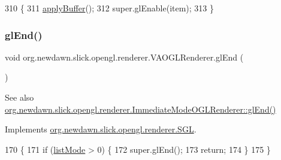 \begin{DoxyCode}
310                                    \{
311         \mbox{\hyperlink{classorg_1_1newdawn_1_1slick_1_1opengl_1_1renderer_1_1_v_a_o_g_l_renderer_a7c5d09419cd40761be8f849631aebab5}{applyBuffer}}();
312         super.glEnable(item);
313     \}
\end{DoxyCode}
\mbox{\label{classorg_1_1newdawn_1_1slick_1_1opengl_1_1renderer_1_1_v_a_o_g_l_renderer_aa652d16e703985c4415f750d7e4483d5}} 
\subsubsection{\texorpdfstring{gl\+End()}{glEnd()}}
{\footnotesize\ttfamily void org.\+newdawn.\+slick.\+opengl.\+renderer.\+V\+A\+O\+G\+L\+Renderer.\+gl\+End (\begin{DoxyParamCaption}{ }\end{DoxyParamCaption})\hspace{0.3cm}{\ttfamily [inline]}}

\begin{DoxySeeAlso}{See also}
\mbox{\hyperlink{classorg_1_1newdawn_1_1slick_1_1opengl_1_1renderer_1_1_immediate_mode_o_g_l_renderer_aed3061aaf4d048fe00f25d191974b0f3}{org.\+newdawn.\+slick.\+opengl.\+renderer.\+Immediate\+Mode\+O\+G\+L\+Renderer\+::gl\+End()}} 
\end{DoxySeeAlso}


Implements \mbox{\hyperlink{interfaceorg_1_1newdawn_1_1slick_1_1opengl_1_1renderer_1_1_s_g_l_a7f5666aaa59b12617ab81e1263140f72}{org.\+newdawn.\+slick.\+opengl.\+renderer.\+S\+GL}}.


\begin{DoxyCode}
170                         \{
171         \textcolor{keywordflow}{if} (\mbox{\hyperlink{classorg_1_1newdawn_1_1slick_1_1opengl_1_1renderer_1_1_v_a_o_g_l_renderer_afee8361b229cada04ad11d9ee44c7284}{listMode}} > 0) \{
172             super.glEnd();
173             \textcolor{keywordflow}{return};
174         \}
175     \}
\end{DoxyCode}
\mbox{\label{classorg_1_1newdawn_1_1slick_1_1opengl_1_1renderer_1_1_v_a_o_g_l_renderer_abc1608fbc94c9ad4101ed15cea4e66ef}} 
